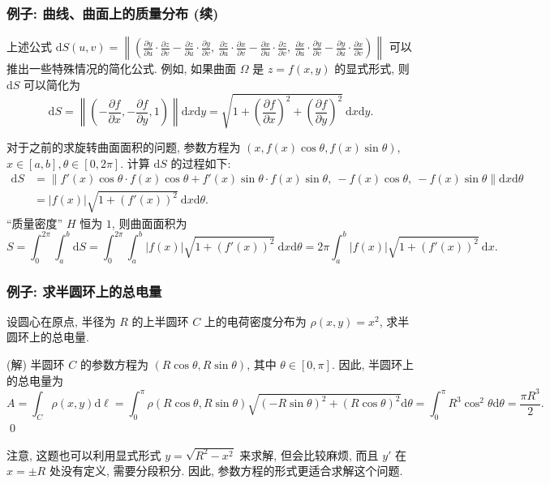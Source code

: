 \begin{frame}
\frametitle{例子: 曲线、曲面上的质量分布 (续)}

上述公式 $\mathrm{d} S(u, v) = \left\lVert \left( \frac{\partial y}{\partial u} \cdot \frac{\partial z}{\partial v} - \frac{\partial z}{\partial u} \cdot \frac{\partial y}{\partial v}, ~ \frac{\partial z}{\partial u} \cdot \frac{\partial x}{\partial v} - \frac{\partial x}{\partial u} \cdot \frac{\partial z}{\partial v}, ~ \frac{\partial x}{\partial u} \cdot \frac{\partial y}{\partial v} - \frac{\partial y}{\partial u} \cdot \frac{\partial x}{\partial v} \right) \right\rVert$ 可以推出一些特殊情况的简化公式. 例如, 如果曲面 $\Omega$ 是 $z = f(x,y)$ 的显式形式, 则 $\mathrm{d} S$ 可以简化为
\[
\mathrm{d} S = \left\lVert \left( -\frac{\partial f}{\partial x}, -\frac{\partial f}{\partial y}, 1 \right) \right\rVert \mathrm{d}x \mathrm{d}y = \sqrt{1 + \left(\frac{\partial f}{\partial x}\right)^2 + \left(\frac{\partial f}{\partial y}\right)^2} ~ \mathrm{d}x \mathrm{d}y.
\]

\pause

对于之前的求旋转曲面面积的问题, 参数方程为 $(x, f(x)\cos \theta, f(x) \sin \theta)$, $x \in [a,b], \theta \in [0, 2\pi]$. 计算 $\mathrm{d} S$ 的过程如下:
\begin{align*}
\mathrm{d} S & = \left\lVert f'(x) \cos\theta \cdot f(x) \cos\theta + f'(x) \sin\theta \cdot f(x) \sin\theta, ~ -f(x) \cos\theta, ~ - f(x) \sin\theta \right\rVert \mathrm{d}x \mathrm{d}\theta \\
& = |f(x)| \sqrt{1 + (f'(x))^2} ~ \mathrm{d}x \mathrm{d}\theta.
\end{align*}
``质量密度'' $H$ 恒为 $1$, 则曲面面积为
\[
S = \int_0^{2\pi} \int_a^b \mathrm{d} S = \int_0^{2\pi} \int_a^b |f(x)| \sqrt{1 + (f'(x))^2} ~ \mathrm{d}x \mathrm{d}\theta = 2\pi \int_a^b |f(x)| \sqrt{1 + (f'(x))^2} ~ \mathrm{d}x.
\]

\end{frame}


\begin{frame}
\frametitle{例子: 求半圆环上的总电量}

\begin{question}
设圆心在原点, 半径为 $R$ 的上半圆环 $C$ 上的电荷密度分布为 $\rho(x, y) = x^2$, 求半圆环上的总电量.
\end{question}

\pause

\startproof[bg=yellow, fg=red](解)
半圆环 $C$ 的参数方程为 $(R \cos \theta, R \sin \theta)$, 其中 $\theta \in [0, \pi]$. 因此, 半圆环上的总电量为
\[
A = \int_C \rho(x, y) \mathrm{d}\ell = \int_0^\pi \rho(R \cos \theta, R \sin \theta) \sqrt{(-R \sin \theta)^2 + (R \cos \theta)^2} \mathrm{d}\theta = \int_0^\pi R^3 \cos^2 \theta \mathrm{d}\theta = \frac{\pi R^3}{2}.
\]
\qed

\pause

\alert{注意}, 这题也可以利用显式形式 $y = \sqrt{R^2 - x^2}$ 来求解, 但会比较麻烦, 而且 $y'$ 在 $x = \pm R$ 处没有定义, 需要分段积分. 因此, 参数方程的形式更适合求解这个问题.

\end{frame}

